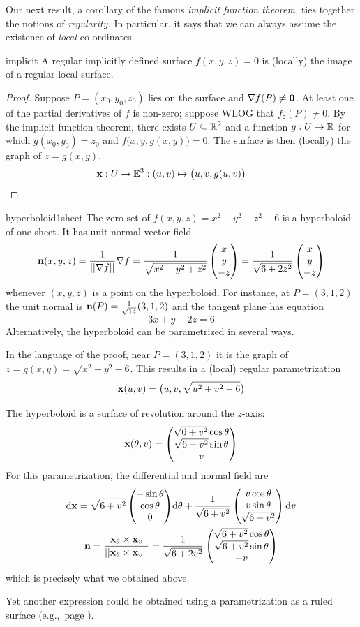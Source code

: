 Our next result, a corollary of the famous \emph{implicit function theorem,} ties together the notions of \emph{regularity.} In particular, it says that we can always assume the existence of \emph{local} co-ordinates.

\begin{thm}{}{implicit}
	A regular implicitly defined surface $f(x,y,z)=0$ is (locally) the image of a regular local surface.
\end{thm}

\begin{proof}
	Suppose $P=(x_0,y_0,z_0)$ lies on the surface and $\nabla f(P)\neq\mathbf{0}$. At least one of the partial derivatives of $f$ is non-zero; suppose WLOG that $f_z(P)\neq 0$. By the implicit function theorem, there exists $U\subseteq\mathbb{R}^2$ and a function $g:U\to\mathbb{R}$ for which $g(x_0,y_0)=z_0$ and $f\big(x,y,g(x,y)\big)=0$. The surface is then (locally) the graph of $z=g(x,y)$.
	\[
		{\mathbf{x}}:U\to\mathbb{E}^3:(u,v)\mapsto\bigl(u,v,g(u,v)\bigr) \tag*{\qedhere}
	\]
\end{proof}


\begin{example}{}{hyperboloid1sheet}
	The zero set of $f(x,y,z)=x^2+y^2-z^2-6$ is a hyperboloid of one sheet. It has unit normal vector field
	\[
		{\mathbf{n}}(x,y,z)=\frac 1{\left| \left| \nabla f\right|\right|}\nabla f=\frac{1}{\sqrt{x^2+y^2+z^2}}\begin{pmatrix}x\\y\\-z\end{pmatrix} =\frac{1}{\sqrt{6+2z^2}}\begin{pmatrix}x\\y\\-z\end{pmatrix}
	\]
	whenever $(x,y,z)$ is a point on the hyperboloid. For instance, at $P=(3,1,2)$ the unit normal is ${\mathbf{n}}(P)=\frac{1}{\sqrt{14}}(3,1,2)$ and the tangent plane has equation
	\[
		3x+y-2z=6
	\]
	Alternatively, the hyperboloid can be parametrized in several ways.
	\begin{enumeratea}
		\item In the language of the proof, near $P=(3,1,2)$ it is the graph of $z=g(x,y)=\sqrt{x^2+y^2-6}$. This results in a (local) regular parametrization
		\[
			{\mathbf{x}}(u,v)=\bigl(u,v,\sqrt{u^2+v^2-6}\bigr)
		\]
		\item The hyperboloid is a surface of revolution around the $z$-axis:
		\[
			{\mathbf{x}}(\theta,v) =\begin{pmatrix}\sqrt{6+v^2}\cos\theta\\\sqrt{6+v^2}\sin\theta\\v\end{pmatrix}
		\]
		For this parametrization, the differential and normal field are
		\begin{gather*}
			\mathrm{d}{\mathbf{x}}=\sqrt{6+v^2}\begin{pmatrix}-\sin\theta\\\cos\theta\\0\end{pmatrix}\!{\mathrm{d}\theta} +\frac 1{\sqrt{6+v^2}}\begin{pmatrix}v\cos\theta\\v\sin\theta\\\sqrt{6+v^2}\end{pmatrix}{\mathrm{d}v}\\
			{\mathbf{n}}=\frac{{\mathbf{x}}_\theta\times{\mathbf{x}}_v}{\left| \left| {\mathbf{x}}_\theta\times{\mathbf{x}}_v\right|\right|} =\frac 1{\sqrt{6+2v^2}} \begin{pmatrix}\sqrt{6+v^2}\cos\theta\\\sqrt{6+v^2}\sin\theta\\-v\end{pmatrix}
		\end{gather*}
	 	which is precisely what we obtained above.
	\end{enumeratea}
	Yet another expression could be obtained using a parametrization as a ruled surface (e.g.,\ page \pageref{page:hyperrule}).
\end{example}



